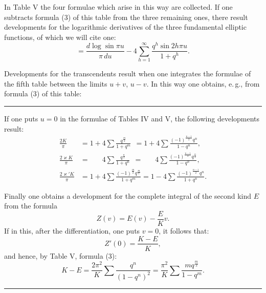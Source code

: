 In Table V the four formulae which arise in this way are collected. If one subtracts formula (3) of this table from the three remaining ones, there result developments for the logarithmic derivatives of the three fundamental elliptic functions, of which we will cite one:
\[
= \frac{d\log\sin\pi u}{\pi\,du} - 4\sum_{h=1}^{\infty}\frac{q^h\sin 2h\pi u}{1+q^h}.
\]

Developments for the transcendents  result when one integrates the formulae of the fifth table between the limits $u+v$, $u-v$. In this way one obtains, e.\,g., from formula (3) of this table:

\begin{center}
\rule{2cm}{0.4pt}
\end{center}

If one puts $u=0$ in the formulae of Tables IV and V, the following developments result:
\[
\begin{aligned}
\frac{2K}{\pi} &= 1+4\sum\frac{q^{\frac{m}{2}}}{1+q^m} \phantom{,} = 1+4\sum\frac{(-1)^{\frac{n-1}{2}}q^n}{1-q^n}, \\
\frac{2\varkappa K}{\pi} &= \phantom{1+{}} 4\sum\frac{q^{\frac{n}{2}}}{1+q^n} \phantom{,} = \phantom{1+{}} 4\sum\frac{(-1)^{\frac{n-1}{2}}q^{\frac{n}{2}}}{1-q^n}, \\
\frac{2\varkappa'K}{\pi} &= 1+4\sum\frac{(-1)^{\frac{m}{2}}q^{\frac{m}{2}}}{1+q^m} = 1-4\sum\frac{(-1)^{\frac{n-1}{2}}q^n}{1+q^n}.
\end{aligned}
\]

Finally one obtains a development for the complete integral of the second kind $E$ from the formula
\[
Z(v) = E(v) - \frac{E}{K}v.
\]
If in this, after the differentiation, one puts $v=0$, it follows that:
\[
Z'(0) = \frac{K-E}{K},
\]
and hence, by Table V, formula (3):
\[
K-E = \frac{2\pi^2}{K}\sum\frac{q^n}{(1-q^n)^2} = \frac{\pi^2}{K}\sum\frac{mq^{\frac{m}{2}}}{1-q^m}.
\]

\begin{center}
\rule{2.8cm}{0.4pt}
\end{center}
